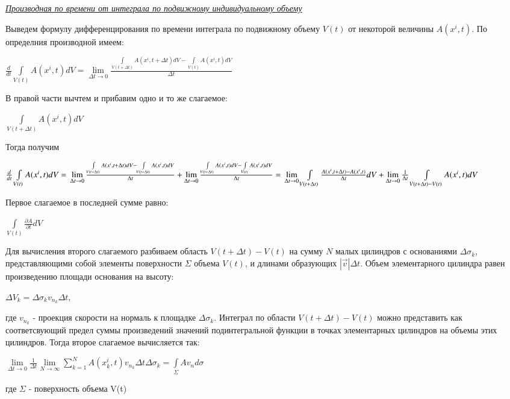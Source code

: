 \begin{center}
    \textit{\underline{Производная по времени от интеграла по подвижному индивидуальному объему}}
\end{center}
Выведем формулу дифференцирования по времени интеграла по подвижному объему $V(t)$ от некоторой величины $A(x^i, t)$. По определния производной имеем:
\begin{center}$
\frac{d}{dt} \int\limits_{V(t)} A(x^i,t) dV =
\lim\limits_{\Delta t \to 0} \frac{\int\limits_{V(t + \Delta t)} A(x^i,t + \Delta t)dV - \int\limits_{V(t)}A(x^i,t)dV}{\Delta t}
$\end{center}
В правой части вычтем и прибавим одно и то же слагаемое:
\begin{center}$
\int\limits_{V(t + \Delta t)} A(x^i, t)dV
$\end{center}
Тогда получим
\begin{center}$
\frac{d}{dt} \int\limits_{V(t)} A(x^i,t) dV
=\newline
\lim\limits_{\Delta t \to 0} \frac{\int\limits_{V(t + \Delta t)} A(x^i,t + \Delta t)dV - \int\limits_{V(t + \Delta t)}A(x^i,t)dV}{\Delta t}
+
\lim\limits_{\Delta t \to 0} \frac{\int\limits_{V(t + \Delta t)} A(x^i,t)dV - \int\limits_{V(t)}A(x^i,t)dV}{\Delta t}
=\newline
\lim\limits_{\Delta t \to 0}\int\limits_{V(t + \Delta t)} \frac{A(x^i, t + \Delta t) - A(x^i, t)}{\Delta t}dV
+
\lim\limits_{\Delta t \to 0}\frac{1}{\Delta t}\int\limits_{V(t + \Delta t) - V(t)}A(x^i, t)dV
$\end{center}
Первое слагаемое в последней сумме равно:
\begin{center}$
\int\limits_{V(t)}\frac{\partial A}{\partial t}dV
$\end{center}
Для вычисления второго слагаемого разбиваем область $V(t + \Delta t) - V(t)$ на сумму $N$ малых цилиндров с основаниями $\Delta \sigma_k$, представляющими собой элементы поверхности $\Sigma$ объема $V(t)$, и длинами образующих $|\Vec{v}|\Delta
t$. Объем элементарного цилиндра равен произведению площади основания на высоту:
\begin{center}$
\Delta V_k = \Delta \sigma_k v_{n_k} \Delta t,
$\end{center}
где $v_{n_k}$ - проекция скорости на нормаль к площадке $\Delta \sigma_k$. Интеграл по области $V(t + \Delta t) - V(t)$ можно представить как соответсвующий предел суммы произведений значений подинтегральной функции в точках элементарных цилиндров на объемы этих цилиндров. Тогда второе слагаемое вычисляется так:
\begin{center}$
\lim\limits_{\Delta t \to 0} \frac{1}{\Delta t}\lim\limits_{N \to \infty}\sum_{k=1}^{N}A(x_k^i,t)v_{n_k}\Delta t \Delta \sigma_k
=
\int\limits_{\Sigma}Av_n d\sigma
$\end{center}
где $\Sigma$ - поверхность объема V(t)

